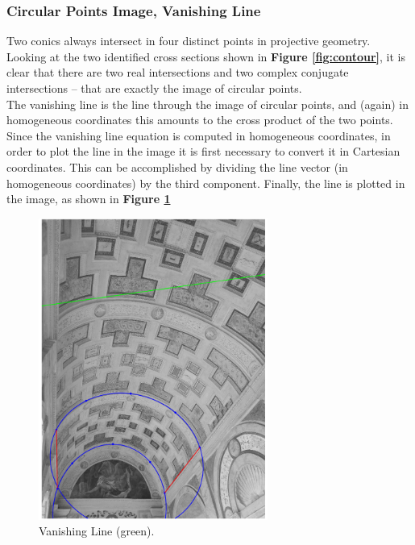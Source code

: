 \documentclass[12pt,a4paper]{article}
\begin{document}
\subsubsection{Circular Points Image, Vanishing Line}\label{sec:toVanishingLine}
Two conics always intersect in four distinct points in projective geometry. Looking at the two identified cross sections shown in \textbf{Figure \ref{fig:contour}}, it is clear that there are two real intersections and two complex conjugate intersections -- that are exactly the image of circular points.\\

The vanishing line is the line through the image of circular points, and (again) in homogeneous coordinates this amounts to the cross product of the two points.\\

Since the vanishing line equation is computed in homogeneous coordinates, in order to plot the line in the image it is first necessary to convert it in Cartesian coordinates. This can be accomplished by dividing the line vector (in homogeneous coordinates) by the third component. Finally, the line is plotted in the image, as shown in \textbf{Figure \ref{fig:vanishingLine}}

\begin{figure}[H]
    \centering
    \includegraphics[width=0.67\textwidth]{Images/PalazzoTe_vanishing_line.png}
    \caption[Vanishing Line.]{Vanishing Line (green).}
    \label{fig:vanishingLine}
\end{figure}
\end{document}
